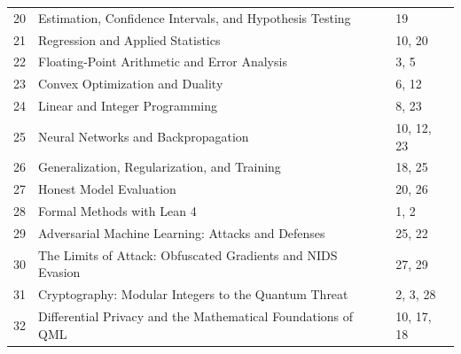 \begin{center}
\begin{tabular}{@{}r p{9.0cm} p{2.8cm}@{}}
20 & Estimation, Confidence Intervals, and Hypothesis Testing & 19 \\
21 & Regression and Applied Statistics & 10, 20 \\
22 & Floating-Point Arithmetic and Error Analysis & 3, 5 \\
23 & Convex Optimization and Duality & 6, 12 \\
24 & Linear and Integer Programming & 8, 23 \\
25 & Neural Networks and Backpropagation & 10, 12, 23 \\
26 & Generalization, Regularization, and Training & 18, 25 \\
27 & Honest Model Evaluation & 20, 26 \\
28 & Formal Methods with Lean 4 & 1, 2 \\
29 & Adversarial Machine Learning: Attacks and Defenses & 25, 22 \\
30 & The Limits of Attack: Obfuscated Gradients and NIDS Evasion & 27, 29 \\
31 & Cryptography: Modular Integers to the Quantum Threat & 2, 3, 28 \\
32 & Differential Privacy and the Mathematical Foundations of QML & 10, 17, 18 \\
\bottomrule
\end{tabular}
\end{center}

\cleardoublepage
{}
{}
\listoffigures
